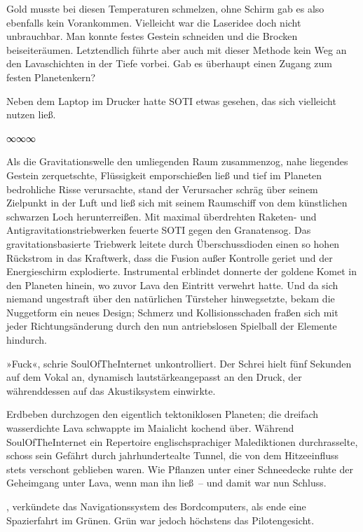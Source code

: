 Gold musste bei diesen Temperaturen schmelzen, ohne Schirm gab es also ebenfalls kein Vorankommen. Vielleicht war die Laseridee doch nicht unbrauchbar. Man konnte festes Gestein schneiden und die Brocken beiseiteräumen. Letztendlich führte aber auch mit dieser Methode kein Weg an den Lavaschichten in der Tiefe vorbei. Gab es überhaupt einen Zugang zum festen Planetenkern?

Neben dem Laptop im Drucker hatte SOTI etwas gesehen, das sich vielleicht nutzen ließ.

\begin{center}
∞∞∞
\end{center}

Als die Gravitationswelle den umliegenden Raum zusammenzog, nahe liegendes Gestein zerquetschte, Flüssigkeit emporschießen ließ und tief im Planeten bedrohliche Risse verursachte, stand der Verursacher schräg über seinem Zielpunkt in der Luft und ließ sich mit seinem Raumschiff von dem künstlichen schwarzen Loch herunterreißen. Mit maximal überdrehten Raketen- und Antigravitationstriebwerken feuerte SOTI gegen den Granatensog. Das gravitationsbasierte Triebwerk leitete durch Überschussdioden einen so hohen Rückstrom in das Kraftwerk, dass die Fusion außer Kontrolle geriet und der Energieschirm explodierte. Instrumental erblindet donnerte der goldene Komet in den Planeten hinein, wo zuvor Lava den Eintritt verwehrt hatte. Und da sich niemand ungestraft über den natürlichen Türsteher hinwegsetzte, bekam die Nuggetform ein neues Design; Schmerz und Kollisionsschaden fraßen sich mit jeder Richtungsänderung durch den nun antriebslosen Spielball der Elemente hindurch.

»Fuck«, schrie SoulOfTheInternet unkontrolliert. Der Schrei hielt fünf Sekunden auf dem Vokal an, dynamisch lautstärkeangepasst an den Druck, der währenddessen auf das Akustiksystem einwirkte.

Erdbeben durchzogen den eigentlich tektoniklosen Planeten; die dreifach wasserdichte Lava schwappte im Maialicht kochend über. Während SoulOfTheInternet ein Repertoire englischsprachiger Malediktionen durchrasselte, schoss sein Gefährt durch jahrhundertealte Tunnel, die von dem Hitzeeinfluss stets verschont geblieben waren. Wie Pflanzen unter einer Schneedecke ruhte der Geheimgang unter Lava, wenn man ihn ließ~– und damit war nun Schluss.

, verkündete das Navigationssystem des Bordcomputers, als ende eine Spazierfahrt im Grünen. Grün war jedoch höchstens das Pilotengesicht. 

